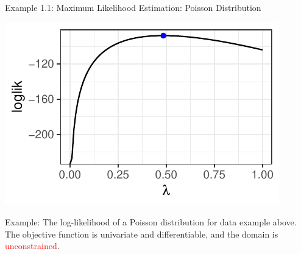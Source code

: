 \begin{vbframe}{Example 1.1: Maximum Likelihood Estimation: Poisson Distribution}
\begin{center}
	\includegraphics[height=0.3\textwidth, keepaspectratio]{figure_man/ml_poisson_example_2.pdf} \\
	\begin{footnotesize}
		Example: The log-likelihood of a Poisson distribution for data example above. The objective function is univariate and differentiable, and the domain is \textcolor{red}{unconstrained}.
	\end{footnotesize}
\end{center}


\end{vbframe}



